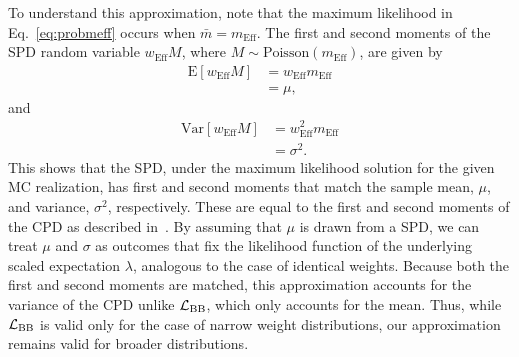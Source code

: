 \documentclass[a4paper, 11pt]{article}
\newcommand{\like}{\mathcal{L}}
\newcommand{\lbarlow}{\like_{\textmd{BB}}}
\newcommand{\meff}{m_\mathrm{Eff}}
\newcommand{\weff}{w_\mathrm{Eff}}
\begin{document}
To understand this approximation, note that the maximum likelihood in Eq.~\eqref{eq:probmeff} occurs when $\bar m = \meff$. The first and second moments of the SPD random variable $\weff M$, where $M \sim \mathrm{Poisson}(\meff)$, are given by
\begin{align}
\mathrm{E}[\weff M] &= \weff \meff \\
&= \mu, \nonumber
\end{align}
and 
\begin{align}
\mathrm{Var}[\weff M] &= \weff^2 \meff \\
&= \sigma^2. \nonumber
\end{align}
This shows that the SPD, under the maximum likelihood solution for the given MC realization, has first and second moments that match the sample mean, $\mu$, and variance, $\sigma^2$, respectively. These are equal to the first and second moments of the CPD as described in~\cite{Bohm:2013gla}. By assuming that $\mu$ is drawn from a SPD, we can treat $\mu$ and $\sigma$ as outcomes that fix the likelihood function of the underlying scaled expectation $\lambda$, analogous to the case of identical weights. Because both the first and second moments are matched, this approximation accounts for the variance of the CPD unlike $\lbarlow$, which only accounts for the mean. Thus, while $\lbarlow$ is valid only for the case of narrow weight distributions, our approximation remains valid for broader distributions.
\end{document}
